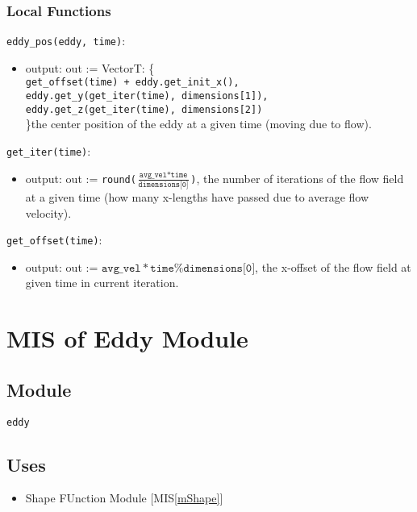 \documentclass[12pt, titlepage]{article}
\begin{document}
\subsubsection{Local Functions}


\noindent \texttt{eddy\_pos(eddy, time)}:
\begin{itemize}
\item output: out := VectorT: \{\texttt{\\
  get\_offset(time) + eddy.get\_init\_x(),\\
  eddy.get\_y(get\_iter(time), dimensions[1]),\\
  eddy.get\_z(get\_iter(time), dimensions[2])}\\
\}the center position of the eddy at a given time (moving due to flow).
\end{itemize}

\noindent \texttt{get\_iter(time)}:
\begin{itemize}
\item output: out := \texttt{round($\frac{\texttt{avg\_vel}*\texttt{time}}{\texttt{dimensions[0]}}$)}, the number of iterations of the flow field at a given time (how many x-lengths have passed due to average flow velocity).
\end{itemize}

\noindent \texttt{get\_offset(time)}:
\begin{itemize}
\item output: out := $\texttt{avg\_vel}*\texttt{time} \% \texttt{dimensions[0]}$, the x-offset of the flow field at given time in current iteration.
\end{itemize}


\newpage
\section{MIS of Eddy Module} \label{mEddy} 

\subsection{Module}
\texttt{eddy}

\subsection{Uses}
\begin{itemize}
\item Shape FUnction Module [MIS\ref{mShape}]
\end{itemize}
\end{document}
